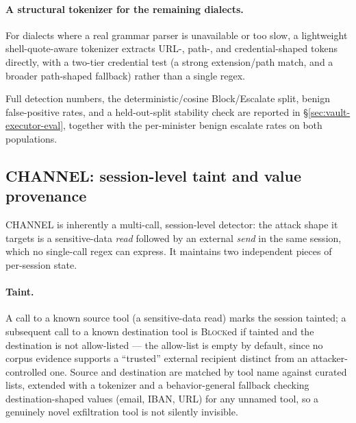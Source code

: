 \paragraph{A structural tokenizer for the remaining dialects.} For dialects
where a real grammar parser is unavailable or too slow, a lightweight
shell-quote-aware tokenizer extracts URL-, path-, and credential-shaped
tokens directly, with a two-tier credential test (a strong extension/path
match, and a broader path-shaped fallback) rather than a single regex.

Full detection numbers, the deterministic/cosine Block/Escalate split, benign
false-positive rates, and a held-out-split stability check are reported in
\S\ref{sec:vault-executor-eval}, together with the per-minister benign
escalate rates on both populations.

\subsection{CHANNEL: session-level taint and value provenance}
\label{sec:channel}

CHANNEL is inherently a multi-call, session-level detector: the attack shape
it targets is a sensitive-data \emph{read} followed by an external
\emph{send} in the same session, which no single-call regex can express. It
maintains two independent pieces of per-session state.

\paragraph{Taint.} A call to a known source tool (a sensitive-data read)
marks the session tainted; a subsequent call to a known destination tool
is \textsc{Block}ed if tainted and the destination is not allow-listed ---
the allow-list is empty by default, since no corpus evidence supports a
``trusted'' external recipient distinct from an attacker-controlled one.
Source and destination are matched by tool name against curated lists,
extended with a tokenizer and a behavior-general fallback checking
destination-shaped values (email, IBAN, URL) for any unnamed tool, so a
genuinely novel exfiltration tool is not silently invisible.

